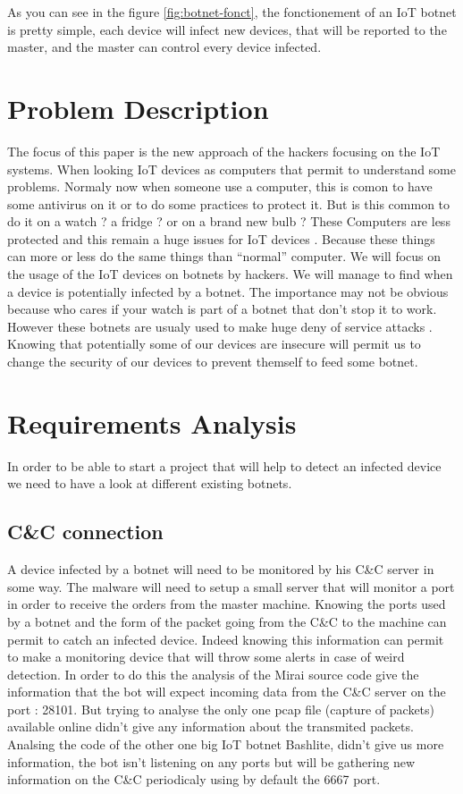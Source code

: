 \documentclass{report}
\begin{document}
As you can see in the figure \ref{fig:botnet-fonct}, the fonctionement of an IoT botnet is pretty simple, each device will infect new devices, that will be reported to the master, and the master can control every device infected.

\chapter{Problem Description}
The focus of this paper is the new approach of the hackers focusing on the IoT systems. When looking IoT devices as computers that permit to understand some problems. Normaly now when someone use a computer, this is comon to have some antivirus on it or to do some practices to protect it. But is this common to do it on a watch ? a fridge ? or on a brand new bulb ? These Computers are less protected and this remain a huge issues for IoT devices \autocite{yang2017survey}. Because these things can more or less do the same things than ``normal'' computer. We will focus on the usage of the IoT devices on botnets by hackers. We will manage to find when a device is potentially infected by a botnet. The importance may not be obvious because who cares if your watch is part of a botnet that don't stop it to work. However these botnets are usualy used to make huge deny of service attacks \autocite{hallman2017ioddos}. Knowing that potentially some of our devices are insecure will permit us to change the security of our devices to prevent themself to feed some botnet.\newline

\chapter{Requirements Analysis}
In order to be able to start a project that will help to detect an infected device we need to have a look at different existing botnets.

\section{C\&C connection}
A device infected by a botnet will need to be monitored by his C\&C server in some way. The malware will need to setup a small server that will monitor a port in order to receive the orders from the master machine. Knowing the ports used by a botnet and the form of the packet going from the C\&C to the machine can permit to catch an infected device. Indeed knowing this information can permit to make a monitoring device that will throw some alerts in case of weird detection.\newline
In order to do this the analysis of the Mirai source code give the information that the bot will expect incoming data from the C\&C server on the port : 28101.
But trying to analyse the only one pcap file (capture of packets) available online didn't give any information about the transmited packets.
Analsing the code of the other one big IoT botnet Bashlite, didn't give us more information, the bot isn't listening on any ports but will be gathering new information on the C\&C periodicaly using by default the 6667 port.
\end{document}
